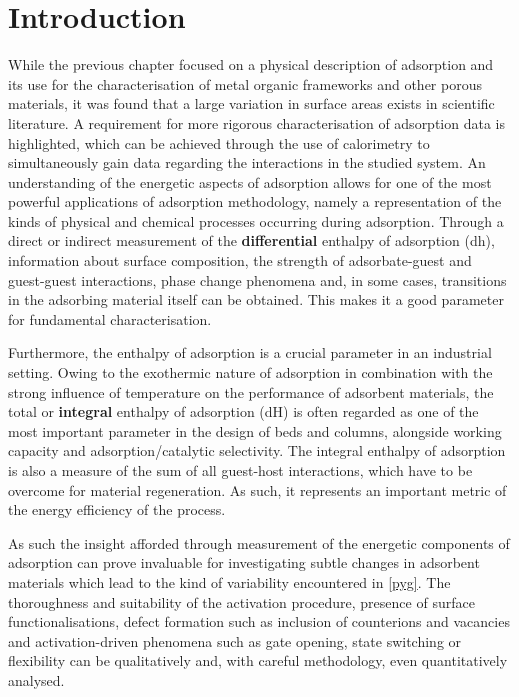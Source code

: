 
\section{Introduction}

While the previous chapter focused on a physical description
of adsorption and its use for the characterisation of
metal organic frameworks and other porous materials, it was found that 
a large variation in surface areas exists in scientific literature.
A requirement for more rigorous characterisation of adsorption data
is highlighted, which can be achieved through the use of calorimetry
to simultaneously gain data regarding the interactions in the 
studied system. An understanding of the energetic
aspects of adsorption allows for one of the most powerful
applications of adsorption methodology, namely a representation
of the kinds of physical and chemical processes occurring
during adsorption. Through a direct or indirect measurement
of the \textbf{differential} enthalpy of adsorption 
(\gls{dh}), information about surface composition, 
the strength of adsorbate-guest and guest-guest interactions, 
phase change phenomena and, in some cases, transitions in the
adsorbing material itself can be obtained. This makes it a good
parameter for fundamental characterisation.

Furthermore, the enthalpy of adsorption is a crucial parameter
in an industrial setting. Owing to the exothermic nature of
adsorption in combination with the strong influence of temperature
on the performance of adsorbent materials, the total or 
\textbf{integral} enthalpy of adsorption (\gls{dH}) is
often regarded as one of the most important parameter in the
design of beds and columns, alongside working capacity and
adsorption/catalytic selectivity. The integral enthalpy of adsorption
is also a measure of the sum of all guest-host interactions, which
have to be overcome for material regeneration. As such, it
represents an important metric of the energy efficiency
of the process.

As such the insight afforded through measurement of
the energetic components of adsorption can prove invaluable
for investigating subtle changes in adsorbent materials
which lead to the kind of variability encountered in
\autoref{pyg}. The thoroughness and suitability of the activation
procedure, presence of surface functionalisations, defect
formation such as inclusion of counterions and vacancies
and activation-driven phenomena such as gate opening,
state switching or flexibility can be qualitatively and,
with careful methodology, even quantitatively analysed.

